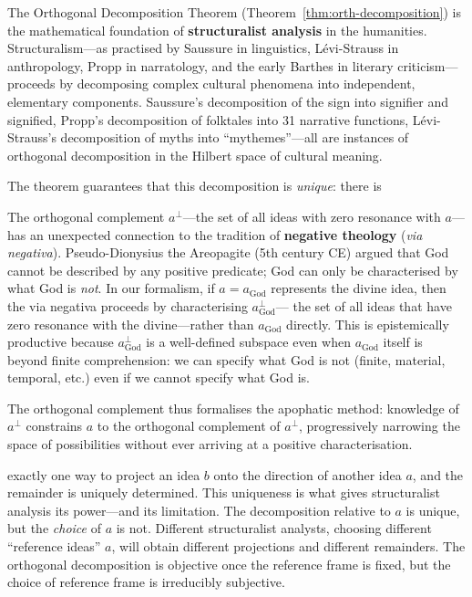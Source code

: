 \begin{interpretation}
\label{interp:ch12:orth_decomp_structuralism}
The Orthogonal Decomposition Theorem (Theorem~\ref{thm:orth-decomposition})
is the mathematical foundation of \textbf{structuralist analysis} in the
humanities.  Structuralism---as practised by Saussure in linguistics, 
L\'evi-Strauss in anthropology, Propp in narratology, and the early Barthes
in literary criticism---proceeds by decomposing complex cultural phenomena
into independent, elementary components.  Saussure's decomposition of the
sign into signifier and signified, Propp's decomposition of folktales into
31 narrative functions, L\'evi-Strauss's decomposition of myths into
``mythemes''---all are instances of orthogonal decomposition in the Hilbert
space of cultural meaning.

The theorem guarantees that this decomposition is \emph{unique}: there is

\begin{remark}
\label{rem:ch12:complement_negative_theology}
The orthogonal complement $a^\perp$---the set of all ideas with zero
resonance with $a$---has an unexpected connection to the tradition of
\textbf{negative theology} (\emph{via negativa}).  Pseudo-Dionysius the
Areopagite (5th century CE) argued that God cannot be described by any
positive predicate; God can only be characterised by what God is \emph{not}.
In our formalism, if $a = a_{\mathrm{God}}$ represents the divine idea,
then the via negativa proceeds by characterising $a_{\mathrm{God}}^\perp$---
the set of all ideas that have zero resonance with the divine---rather than
$a_{\mathrm{God}}$ directly.  This is epistemically productive because
$a_{\mathrm{God}}^\perp$ is a well-defined subspace even when
$a_{\mathrm{God}}$ itself is beyond finite comprehension: we can specify
what God is not (finite, material, temporal, etc.) even if we cannot specify
what God is.

The orthogonal complement thus formalises the apophatic method: knowledge
of $a^\perp$ constrains $a$ to the orthogonal complement of $a^\perp$,
progressively narrowing the space of possibilities without ever arriving
at a positive characterisation.
\end{remark}


exactly one way to project an idea $b$ onto the direction of another idea
$a$, and the remainder is uniquely determined.  This uniqueness is what gives
structuralist analysis its power---and its limitation.  The decomposition
relative to $a$ is unique, but the \emph{choice} of $a$ is not.  Different
structuralist analysts, choosing different ``reference ideas'' $a$, will
obtain different projections and different remainders.  The orthogonal
decomposition is objective once the reference frame is fixed, but the choice
of reference frame is irreducibly subjective.


\end{interpretation}
